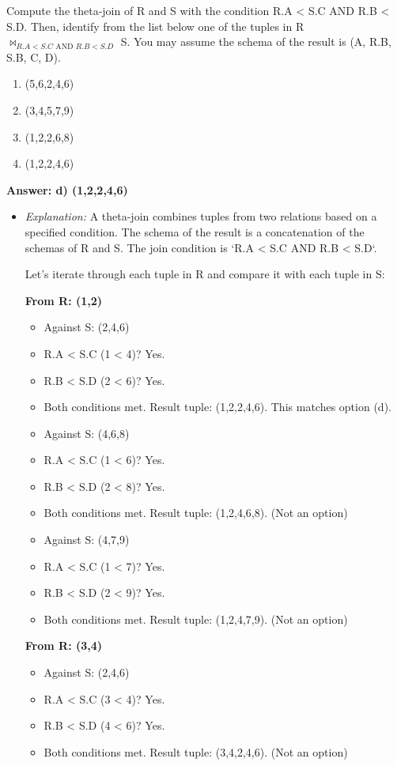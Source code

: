 \documentclass{article}
\begin{document}
\begin{enumerate}[label=\textbf{Question \arabic*.}]
    Compute the theta-join of R and S with the condition R.A < S.C AND R.B < S.D. Then, identify from the list below one of the tuples in R $\Join_{R.A<S.C \text{ AND } R.B<S.D}$ S. You may assume the schema of the result is (A, R.B, S.B, C, D).
    \begin{enumerate}[label=\alph*)]
        \item (5,6,2,4,6)
        \item (3,4,5,7,9)
        \item (1,2,2,6,8)
        \item (1,2,2,4,6)
    \end{enumerate}
    \textbf{Answer: d) (1,2,2,4,6)}
    \begin{itemize}
        \item \textit{Explanation:} A theta-join combines tuples from two relations based on a specified condition. The schema of the result is a concatenation of the schemas of R and S. The join condition is `R.A < S.C AND R.B < S.D`.

        Let's iterate through each tuple in R and compare it with each tuple in S:

        \textbf{From R: (1,2)}
        \begin{itemize}
            \item Against S: (2,4,6)
                \item R.A < S.C (1 < 4)? Yes.
                \item R.B < S.D (2 < 6)? Yes.
                \item Both conditions met. Result tuple: (1,2,2,4,6). This matches option (d).

            \item Against S: (4,6,8)
                \item R.A < S.C (1 < 6)? Yes.
                \item R.B < S.D (2 < 8)? Yes.
                \item Both conditions met. Result tuple: (1,2,4,6,8). (Not an option)

            \item Against S: (4,7,9)
                \item R.A < S.C (1 < 7)? Yes.
                \item R.B < S.D (2 < 9)? Yes.
                \item Both conditions met. Result tuple: (1,2,4,7,9). (Not an option)
        \end{itemize}

        \textbf{From R: (3,4)}
        \begin{itemize}
            \item Against S: (2,4,6)
                \item R.A < S.C (3 < 4)? Yes.
                \item R.B < S.D (4 < 6)? Yes.
                \item Both conditions met. Result tuple: (3,4,2,4,6). (Not an option)


\end{itemize}
\end{itemize}
\end{enumerate}
\end{document}
